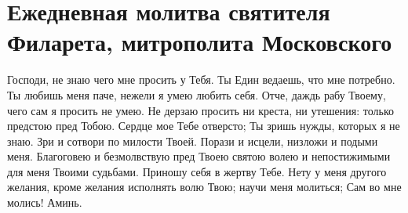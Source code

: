 \section{Ежедневная молитва святителя Филарета, митрополита Московского}\begin{mymulticols}
 

Господи, не знаю чего мне просить у Тебя. Ты Един ведаешь, что мне потребно. Ты любишь меня паче, нежели я умею любить себя. Отче, даждь рабу Твоему, чего сам я просить не умею. Не дерзаю просить ни креста, ни утешения: только предстою пред Тобою. Сердце мое Тебе отверсто; Ты зришь нужды, которых я не знаю. Зри и сотвори по милости Твоей. Порази и исцели, низложи и подыми меня. Благоговею и безмолвствую пред Твоею святою волею и непостижимыми для меня Твоими судьбами. Приношу себя в жертву Тебе. Нету у меня другого желания, кроме желания исполнять волю Твою; научи меня молиться; Сам во мне молись! Аминь. 

\end{mymulticols}

